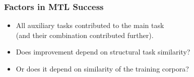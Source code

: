 \documentclass[t,xcolor={svgnames}]{beamer}
\begin{document}
\similaritydata
	    
\begin{frame}
\frametitle{Factors in MTL Success}
\begin{itemize}
\item All auxiliary tasks contributed to the main task \\
      (and their combination contributed further).
\item<2-3> Does improvement depend on structural task similarity?
\item<3> Or does it depend on similarity of the training corpora?
\end{itemize}


\end{frame}
\end{document}
